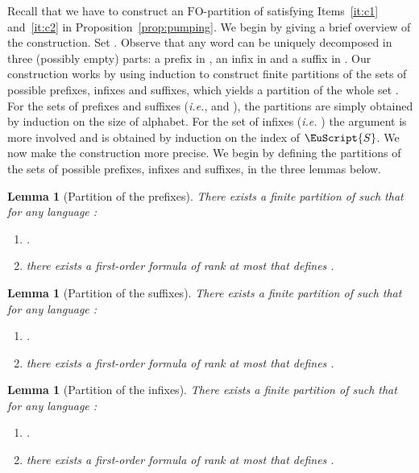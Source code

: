 \documentclass{CSML}
\newcommand\Ss{\ensuremath{\EuScript{S}}\xspace}
\newcommand{\fo}{\ensuremath{\text{FO}}\xspace}
\theoremstyle{plain}
\newtheorem{lemma}[thm]{Lemma}
\begin{document}
\medskip
Recall that we have to construct an \fo-partition  of 
satisfying Items~\ref{it:c1} and~\ref{it:c2} in
Proposition~\ref{prop:pumping}. We begin by giving a brief overview of
the construction. Set . Observe that any word
 can be uniquely decomposed in three (possibly empty)
parts: a prefix in , an infix in  and a suffix in
. Our construction works by using induction to construct finite
partitions of the sets of possible prefixes, infixes and suffixes,
which yields a partition of the whole set . For the sets of
prefixes and suffixes (\emph{i.e.},  and ), the partitions
are simply obtained by induction on the size of alphabet. For the set
of infixes (\emph{i.e.} ) the argument is more involved
and is obtained by induction on the index of \Ss. We now make the
construction more precise. We begin by defining the partitions of the
sets of possible prefixes, infixes and suffixes, in the three lemmas
below.

\begin{lemma}[Partition of the prefixes] \label{lem:partpref}
There exists a finite partition  of  such that for any
language :
\begin{enumerate}
\item .
\item there exists a first-order formula of
  rank at most  that defines .
\end{enumerate}
\end{lemma}

\begin{lemma}[Partition of the suffixes] \label{lem:partsuff}
There exists a finite partition  of  such that for any
language :
\begin{enumerate}
\item\label{it:c1induction2} .
\item\label{it:c2induction2} there exists a first-order formula of
  rank at most  that defines .
\end{enumerate}
\end{lemma}

\begin{lemma}[Partition of the infixes] \label{lem:partinf}
There exists a finite partition  of  such that
for any language :
\begin{enumerate}
\item .
\item there exists a first-order formula of
  rank at most  that defines .
\end{enumerate}
\end{lemma}
\end{document}

